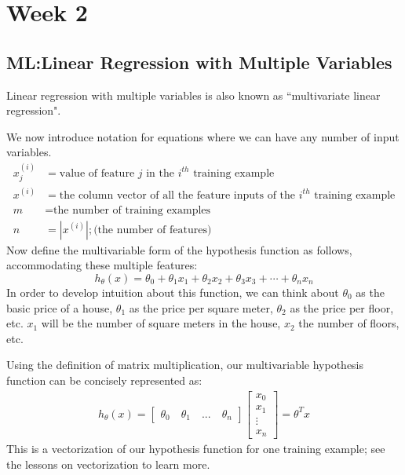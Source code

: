 \chapter{Week 2}
\section{ML:Linear Regression with Multiple Variables}
Linear regression with multiple variables is also known as ``multivariate linear regression".

We now introduce notation for equations where we can have any number of input variables.
\begin{align*}
x_j^{(i)} &= \text{value of feature } j \text{ in the }i^{th}\text{ training example} \\ 
x^{(i)}& = \text{the column vector of all the feature inputs of the }i^{th}\text{ training example} \\ 
m &= \text{the number of training examples} \\ 
n &= \left| x^{(i)} \right| ; \text{(the number of features)} 
\end{align*}
Now define the multivariable form of the hypothesis function as follows, accommodating these multiple features:
\begin{equation}
h_\theta (x) = \theta_0 + \theta_1 x_1 + \theta_2 x_2 + \theta_3 x_3 + \cdots + \theta_n x_n
\end{equation}
In order to develop intuition about this function, we can think about $\theta_0 $ as the basic price of a house, $\theta_1$ as the price per square meter, $\theta_2$ as the price per floor, etc. $x_1$ will be the number of square meters in the house, $x_2$ the number of floors, etc.

Using the definition of matrix multiplication, our multivariable hypothesis function can be concisely represented as:
\begin{align*}
h_\theta(x) =
\begin{bmatrix}
\theta_0 \quad \theta_1 \quad  ...  \quad  \theta_n
\end{bmatrix}
\begin{bmatrix}
x_0 \\ x_1 \\ \vdots \\ x_n
\end{bmatrix}
= \theta^T x
\end{align*}
This is a vectorization of our hypothesis function for one training example; see the lessons on vectorization to learn more.

